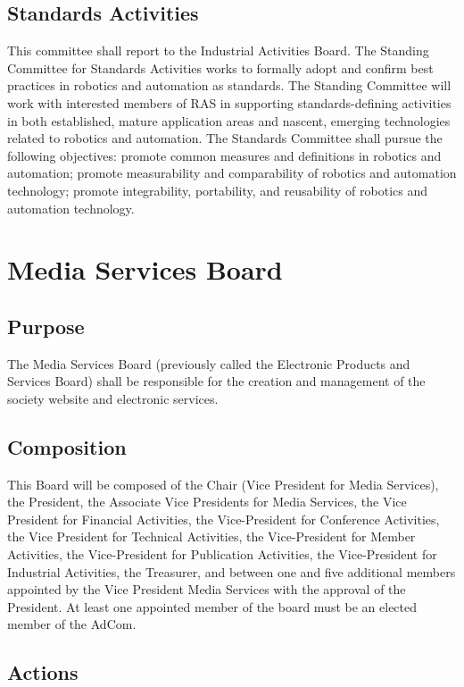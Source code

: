 \documentclass[10pt]{article}
\begin{document}
\subsection{Standards Activities}
This committee shall report to the Industrial Activities Board. The Standing Committee for Standards Activities works to formally adopt and confirm best practices in robotics and automation as standards. The Standing Committee will work with interested members of RAS in supporting standards-defining activities in both established, mature application areas and nascent, emerging technologies related to robotics and automation. The Standards Committee shall pursue the following objectives: promote common measures and definitions in robotics and automation; promote measurability and comparability of robotics and automation technology; promote integrability, portability, and reusability of robotics and automation technology.

\section{Media Services Board}
\label{MSB}

\subsection{Purpose}

The Media Services Board (previously called the Electronic Products and Services Board) shall be responsible for the creation and management of the society website and electronic services.

\subsection{Composition}

This Board will be composed of the Chair (Vice President for Media Services), the President, the Associate Vice Presidents for Media Services, the Vice President for Financial Activities, the Vice-President for Conference Activities,  the Vice President for Technical Activities, the Vice-President for Member Activities, the Vice-President for Publication Activities, the Vice-President for Industrial Activities, the Treasurer, and between one and five additional members appointed by the Vice President Media Services with the approval of the President. At least one appointed member of the board must be an elected member of the AdCom.  

\subsection{Actions}
\end{document}
